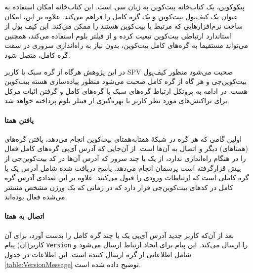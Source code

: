   پیکوکوین،‌ یک کتاب‌خانه بیت‌کوین به زبان سی است. این کتاب‌خانه امکان استفاده به عنوان یک کیف‌پول بیت‌کوین و یک گره کامل را فراهم می‌کند. علاوه بر این، امکان ساخت نرم‌افزارهایی که مرتبط با بیت‌کوین هستند را ممکن می‌کند. این کیف پول از استاندارد ارتباطی بیت‌کوین تبعیت کرده و از فیلتر بلوم استفاده می‌کند، همچنین می‌تواند مستقیما به گره‌های کامل بیت‌کوین، بدون نیاز به راه‌اندازی سروری در سمت گره کامل، متصل شود.
  
  در این پژوهش هرگاه از گره سبک یا کاربر SPV صحبت می‌شود منظور کیف‌پول بیت‌کوین‌جی \cite{bitcoinj} و هر گاه از گره کامل صحبت می‌شود منظور پیاده‌سازی هسته بیت‌کوین \cite{Bitcoincore.org} هست. در ادامه به پروتکل ارتباط گره‌های سبک با گره‌های کامل و گرفتن اثبات مرکل  برای تراکنش‌های مورد نظر کاربر با بهره‌گیری از فیتلر بلوم پرداخته خواهد شد. 
  
\paragraph{یافتن همتا}

  اولین گامی که هر گره در شبکهٔ همتا‌به‌همتای بیت‌کوین انجام می‌دهد، یافتن گره‌های (همتا‌های) دیگر و اتصال به آن‌ها است. از آن‌جایی که آدرس آی‌پی گره‌های کامل فعال را در هنگام راه‌اندازی ندارد، از یک یا چند سرور 
 که آدرس‌ آن‌ها در کد بیت‌کوین‌جی از پیش قرارگرفته است پرسمان انجام می‌دهد. پاسخ دریافت شده شامل آدرس یک یا گره کاملی است که ارتباطات ورودی را قبول می‌کنند. علاوه بر این تعدادی آدرس گره کامل در کدهای بیت‌کوین‌جی قرار دارد که در زمانی که یک ورژن مشخص منتشر می‌شده فعال بوده‌اند. 
 \paragraph{اتصال به همتا}
 بعد از آن‌که کاربر جدید آدرس آی‌پی یک یا چند گره کامل را بدست آورد، برای آن کاربر(ان) پیام \texttt{Version} را ارسال می‌کند. این پیام برای ایجاد ارتباط ارسال می‌شود و شامل اطلاعاتی از گره ارسال کننده است. این اطلاعات در جدول \ref{table:VersionMessage} توضیح داده شده است.

